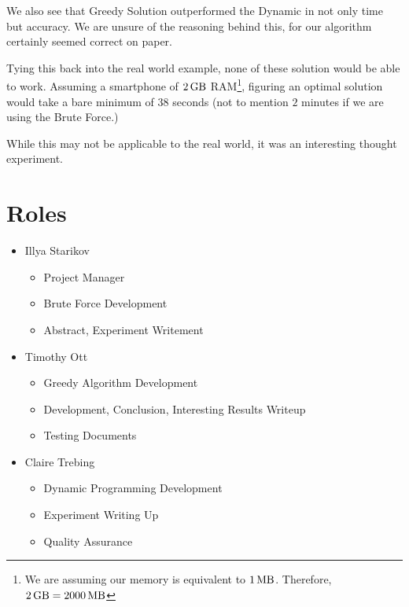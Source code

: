 \documentclass{article}
\begin{document}
We also see that Greedy Solution outperformed the Dynamic in not only time but accuracy. We are unsure of the reasoning behind this, for our algorithm certainly seemed correct on paper.

Tying this back into the real world example, none of these solution would be able to work. Assuming a smartphone of $\SI{2}{\giga\byte}$ RAM\footnote{We are assuming our memory is equivalent to $\SI{1}{\mega\byte}$. Therefore, $\SI{2}{\giga\byte} = \SI{2000}{\mega\byte}$}, figuring an optimal solution would take a bare minimum of $38$ seconds (not to mention $2$ minutes if we are using the Brute Force.)

While this may not be applicable to the real world, it was an interesting thought experiment.

\section{Roles}
\begin{itemize}
    \item Illya Starikov
    \begin{itemize}
        \item Project Manager
        \item Brute Force Development
        \item Abstract, Experiment Writement
    \end{itemize}
    \item Timothy Ott
    \begin{itemize}
        \item Greedy Algorithm Development
        \item Development, Conclusion, Interesting Results Writeup
        \item Testing Documents
    \end{itemize}

    \item Claire Trebing
    \begin{itemize}
        \item Dynamic Programming Development
        \item Experiment Writing Up
        \item Quality Assurance
    \end{itemize}
\end{itemize}
\end{document}
